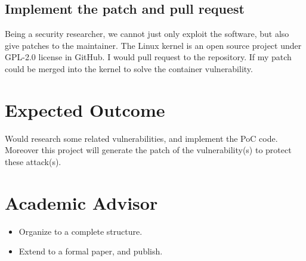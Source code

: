 \documentclass[12pt,a4paper,oneside,draft]{IEEEconf}
\begin{document}
\subsection{Implement the patch and pull request}
Being a security researcher, we cannot just only exploit the software, but also give patches to
the maintainer. The Linux kernel is an open source project under GPL-2.0 license in GitHub.
I would pull request to the repository. If my patch could be merged into the kernel to solve the
container vulnerability.

\section{Expected Outcome}
Would research some related vulnerabilities, and implement the PoC code.
Moreover this project will generate the patch of the vulnerability(s) to protect these attack(s).

\printbibheading[heading=bibnumbered]
\printbibliography\newrefcontext

\section{Academic Advisor}
\begin{itemize}
  \item Organize to a complete structure.
  \item Extend to a formal paper, and publish.
\end{itemize}
\end{document}

